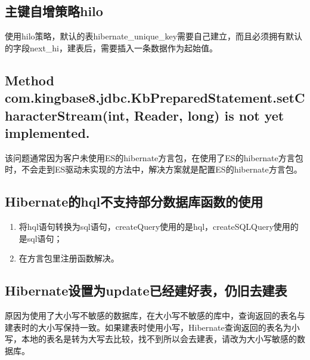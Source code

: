 \documentclass[a4,10pt,oneside,english]{sphinxmanual}
\begin{document}
\subsection{主键自增策略hilo}
\label{\detokenize{interface/hibernate:hilo}}
使用hilo策略，默认的表hibernate\_unique\_key需要自己建立，而且必须拥有默认的字段next\_hi，建表后，需要插入一条数据作为起始值。

\begin{sphinxVerbatim}[commandchars=\\\{\}]
      
    
\end{sphinxVerbatim}


\subsection{Method com.kingbase8.jdbc.KbPreparedStatement.setCharacterStream(int, Reader, long) is not yet implemented.}
\label{\detokenize{interface/hibernate:method-com-kingbase8-jdbc-kbpreparedstatement-setcharacterstream-int-reader-long-is-not-yet-implemented}}
该问题通常因为客户未使用ES的hibernate方言包，在使用了ES的hibernate方言包时，不会走到ES驱动未实现的方法中，解决方案就是配置ES的hibernate方言包。


\subsection{Hibernate的hql不支持部分数据库函数的使用}
\label{\detokenize{interface/hibernate:hibernatehql}}\begin{enumerate}
%
\item {} 
将hql语句转换为sql语句，createQuery使用的是hql，createSQLQuery使用的是sql语句；

\item {} 
在方言包里注册函数解决。

\end{enumerate}


\subsection{Hibernate设置为update已经建好表，仍旧去建表}
\label{\detokenize{interface/hibernate:hibernateupdate}}
原因为使用了大小写不敏感的数据库，在大小写不敏感的库中，查询返回的表名与建表时的大小写保持一致。如果建表时使用小写，Hibernate查询返回的表名为小写，本地的表名是转为大写去比较，找不到所以会去建表，请改为大小写敏感的数据库。
\end{document}
